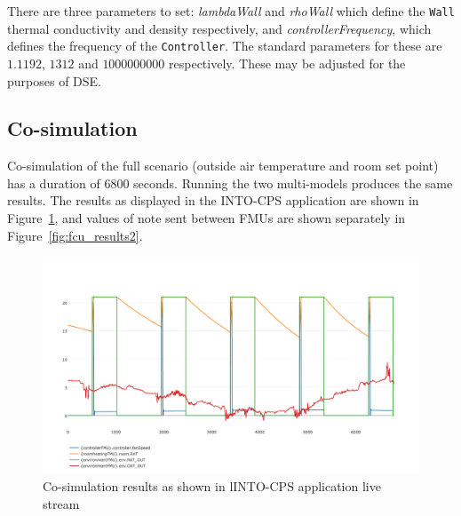 There are three parameters to set: \emph{lambdaWall} and \emph{rhoWall} which define the \texttt{Wall} thermal conductivity and density respectively, and \emph{controllerFrequency}, which defines the frequency of the \texttt{Controller}. The standard parameters for these are $1.1192$, $1312$ and $1000000000$ respectively. These may be adjusted for the purposes of DSE.

\subsection{Co-simulation}
\label{sec:fcu_into_co}

Co-simulation of the full scenario (outside air temperature and room set point) has a duration of 6800 seconds. Running the two multi-models produces the same results. The results as displayed in the INTO-CPS application are shown in Figure~\ref{fig:fcu_results}, and values of note sent between FMUs are shown separately in Figure~\ref{fig:fcu_results2}.

\begin{figure}[htb!]
\begin{center}
   \includegraphics[width=1\linewidth]{fcu/fcu_cosim_app} 
  \caption{Co-simulation results as shown in lINTO-CPS application live stream}
\label{fig:fcu_results}
\end{center}
\end{figure}


